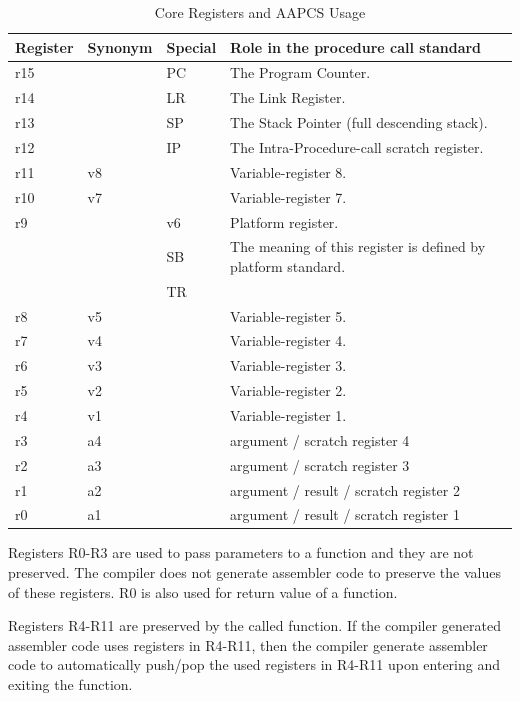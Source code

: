 \begin{table}[ht]
\begin{center}
\footnotesize{
\begin{tabular}{llll}
\hline
Register & Synonym & Special  & Role in the procedure call standard \\ \hline
r15 &   & PC & The Program Counter. \\ \hline
r14 &   & LR & The Link Register. \\
r13 &   & SP & The Stack Pointer (full descending stack). \\ \hline
r12 &   & IP & The Intra-Procedure-call scratch register. \\ \hline
r11 &v8 &    & Variable-register 8. \\
r10 &v7 &    & Variable-register 7.\\ \hline
r9  &   & v6 & Platform register. \\
    &   & SB & The meaning of this register is defined by platform standard. \\
    &   & TR & \\  \hline 
r8  &v5 &    & Variable-register 5. \\ \hline
r7  &v4 &    & Variable-register 4. \\ 
r6  &v3 &    & Variable-register 3. \\ 
r5  &v2 &    & Variable-register 2. \\ 
r4  &v1 &    & Variable-register 1. \\ \hline 
r3  &a4 &    & argument / scratch register 4 \\ 
r2  &a3 &    & argument / scratch register 3 \\
r1  &a2 &    & argument / result / scratch register 2 \\
r0  &a1 &    & argument / result / scratch register 1 \\ \hline
\end{tabular}
\caption{Core Registers and AAPCS Usage}
\label{tb_aapcs}
}
\end{center}
\end{table}
Registers R0-R3 are used to pass parameters to a function and they are not preserved. The compiler does not generate assembler code to preserve the values of these registers.  
R0 is also used for return value of a function. 

Registers R4-R11 are preserved by the called function. 
If the compiler generated assembler code uses registers in R4-R11, 
then the compiler generate assembler code to automatically push/pop the 
used registers in R4-R11 upon entering and exiting the function.  

